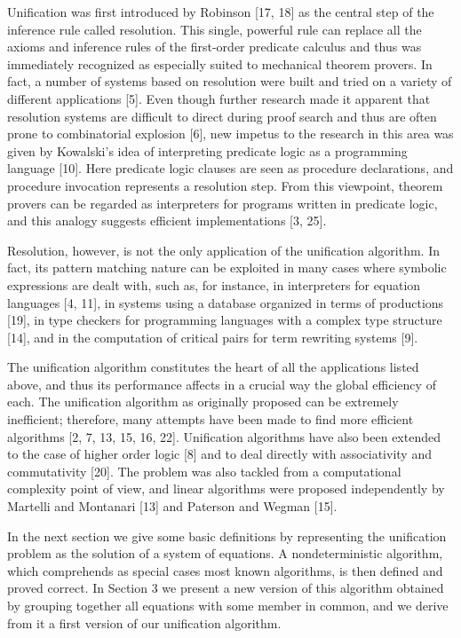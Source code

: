 Unification was first introduced by Robinson [17, 18] as the central step of the
inference rule called resolution. This single, powerful rule can replace all the
axioms and inference rules of the first-order predicate calculus and thus was
immediately recognized as especially suited to mechanical theorem provers. In
fact, a number of systems based on resolution were built and tried on a variety
of different applications [5]. Even though further research made it apparent
that resolution systems are difficult to direct during proof search and thus are
often prone to combinatorial explosion [6], new impetus to the research in this
area was given by Kowalski's idea of interpreting predicate logic as a
programming language [10]. Here predicate logic clauses are seen as procedure
declarations, and procedure invocation represents a resolution step. From this
viewpoint, theorem provers can be regarded as interpreters for programs written
in predicate logic, and this analogy suggests efficient implementations [3, 25].

Resolution, however, is not the only application of the unification algorithm.
In fact, its pattern matching nature can be exploited in many cases where
symbolic expressions are dealt with, such as, for instance, in interpreters for
equation languages [4, 11], in systems using a database organized in terms of
productions [19], in type checkers for programming languages with a complex type
structure [14], and in the computation of critical pairs for term rewriting
systems [9].

The unification algorithm constitutes the heart of all the applications listed
above, and thus its performance affects in a crucial way the global efficiency
of each. The unification algorithm as originally proposed can be extremely
inefficient; therefore, many attempts have been made to find more efficient
algorithms [2, 7, 13, 15, 16, 22]. Unification algorithms have also been
extended to the case of higher order logic [8] and to deal directly with
associativity and commutativity [20]. The problem was also tackled from a
computational complexity point of view, and linear algorithms were proposed
independently by Martelli and Montanari [13] and Paterson and Wegman [15].

In the next section we give some basic definitions by representing the
unification problem as the solution of a system of equations. A nondeterministic
algorithm, which comprehends as special cases most known algorithms, is then
defined and proved correct. In Section 3 we present a new version of this
algorithm obtained by grouping together all equations with some member in
common, and we derive from it a first version of our unification algorithm.

